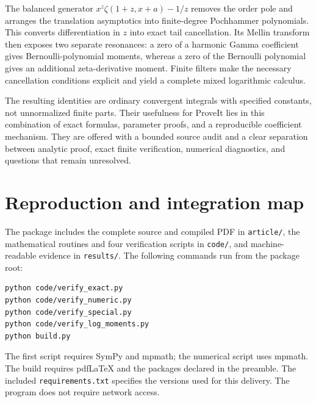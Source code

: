 \documentclass[11pt,letterpaper]{article}
\numberwithin{equation}{section}
\theoremstyle{definition}\newtheorem{definition}[theorem]{Definition}
\theoremstyle{remark}\newtheorem{remark}[theorem]{Remark}
\begin{document}
The balanced generator $x^z\zeta(1+z,x+a)-1/z$ removes the order pole
and arranges the translation asymptotics into finite-degree
Pochhammer polynomials. This converts differentiation in $z$ into
exact tail cancellation. Its Mellin transform then exposes two
separate resonances: a zero of a harmonic Gamma coefficient gives
Bernoulli-polynomial moments, whereas a zero of the Bernoulli
polynomial gives an additional zeta-derivative moment. Finite filters
make the necessary cancellation conditions explicit and yield a
complete mixed logarithmic calculus.

The resulting identities are ordinary convergent integrals with
specified constants, not unnormalized finite parts. Their usefulness
for ProveIt lies in this combination of exact formulas, parameter
proofs, and a reproducible coefficient mechanism. They are offered
with a bounded source audit and a clear separation between analytic
proof, exact finite verification, numerical diagnostics, and questions
that remain unresolved.

\appendix
\section{Reproduction and integration map}\label{bsm:app:reproduction}

The package includes the complete source and compiled PDF in
\texttt{article/}, the mathematical routines and four verification
scripts in \texttt{code/}, and machine-readable evidence in
\texttt{results/}. The following commands run from the package root:
\begin{verbatim}
python code/verify_exact.py
python code/verify_numeric.py
python code/verify_special.py
python code/verify_log_moments.py
python build.py
\end{verbatim}
The first script requires SymPy and mpmath; the numerical script uses
mpmath. The build requires pdfLaTeX and the packages declared in the
preamble. The included \texttt{requirements.txt} specifies the versions
used for this delivery. The program does not require network access.
\end{document}
